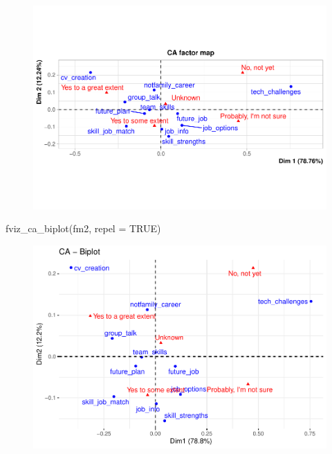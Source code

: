 \documentclass[
]{aft}
\newenvironment{Shaded}{\begin{snugshade}}{\end{snugshade}}
\newcommand{\AttributeTok}[1]{\textcolor[rgb]{0.40,0.45,0.13}{#1}}
\newcommand{\ConstantTok}[1]{\textcolor[rgb]{0.56,0.35,0.01}{#1}}
\newcommand{\FunctionTok}[1]{\textcolor[rgb]{0.28,0.35,0.67}{#1}}
\newcommand{\NormalTok}[1]{\textcolor[rgb]{0.00,0.23,0.31}{#1}}
\begin{document}
\begin{figure}[H]

{\centering \includegraphics{journal_article_files/figure-pdf/unnamed-chunk-7-1.pdf}

}

\end{figure}

\begin{Shaded}
\begin{Highlighting}[]
\FunctionTok{fviz\_ca\_biplot}\NormalTok{(fm2, }\AttributeTok{repel =} \ConstantTok{TRUE}\NormalTok{)}
\end{Highlighting}
\end{Shaded}

\begin{figure}[H]

{\centering \includegraphics{journal_article_files/figure-pdf/unnamed-chunk-8-1.pdf}

}

\end{figure}
\end{document}
